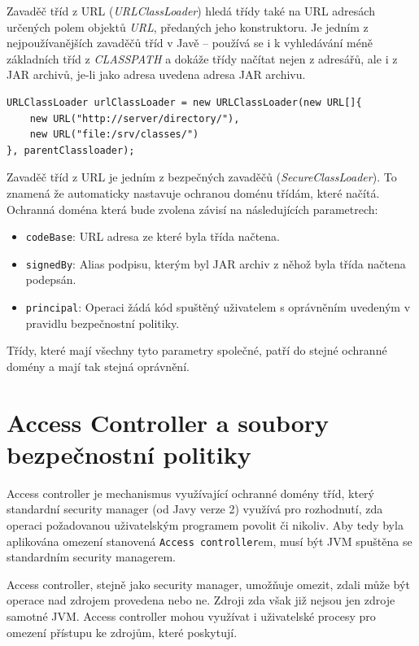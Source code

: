Zavaděč tříd z URL ({\it URLClassLoader}) hledá třídy také na URL adresách určených polem objektů {\it URL}, předaných jeho konstruktoru. Je jedním z nejpoužívanějších zavaděčů tříd v Javě -- používá se i k vyhledávání méně základních tříd z {\it CLASSPATH} a dokáže třídy načítat nejen z adresářů, ale i z JAR archivů, je-li jako adresa uvedena adresa JAR archivu. \cite[3.2.5]{oaks}

\begin{verbatim}
URLClassLoader urlClassLoader = new URLClassLoader(new URL[]{
    new URL("http://server/directory/"),
    new URL("file:/srv/classes/")
}, parentClassloader);
\end{verbatim}

Zavaděč tříd z URL je jedním z bezpečných zavaděčů ({\it SecureClassLoader}). To znamená že automaticky nastavuje ochranou doménu třídám, které načítá.
Ochranná doména která bude zvolena závisí na následujících parametrech: \cite{refPolicyFiles}

\begin{itemize}
  \item {\tt codeBase}: URL adresa ze které byla třída načtena.
  \item {\tt signedBy}: Alias podpisu, kterým byl JAR archiv z něhož byla třída načtena podepsán.
  \item {\tt principal}: Operaci žádá kód spuštěný uživatelem s oprávněním uvedeným v pravidlu bezpečnostní politiky.
\end{itemize}

Třídy, které mají všechny tyto parametry společné, patří do stejné ochranné domény a mají tak stejná oprávnění.

\section{Access Controller a soubory bezpečnostní politiky}

Access controller je mechanismus využívající ochranné domény tříd, který standardní security manager (od Javy verze 2) využívá pro rozhodnutí, zda operaci požadovanou uživatelským programem povolit či nikoliv. Aby tedy byla aplikována omezení stanovená {\tt Access controller}em, musí být JVM spuštěna se standardním security managerem. \cite[5]{oaks}

Access controller, stejně jako security manager, umožňuje omezit, zdali může být operace nad zdrojem provedena nebo ne. Zdroji zda však již nejsou jen zdroje samotné JVM. Access controller mohou využívat i uživatelské procesy pro omezení přístupu ke zdrojům, které poskytují. \cite[5]{oaks}

